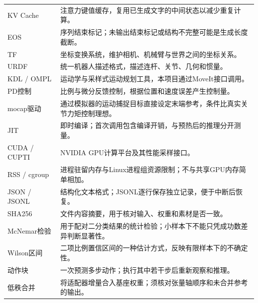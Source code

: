 \begin{longtable}{p{.18\linewidth}p{.72\linewidth}}
KV Cache & 注意力键值缓存，复用已生成文字的中间状态以减少重复计算。\\
EOS & 序列结束标记；未输出结束标记或结构不完整可能是生成长度截断。\\
TF & 坐标变换系统，维护相机、机械臂与世界之间的坐标关系。\\
URDF & 统一机器人描述格式，描述连杆、关节、几何和惯量。\\
KDL / OMPL & 运动学与采样式运动规划工具，本项目通过MoveIt接口调用。\\
PD控制 & 比例与微分反馈控制，根据位置和速度误差产生控制量。\\
mocap驱动 & 通过模拟器的运动捕捉目标直接设定末端参考，条件比真实关节力矩控制理想。\\
JIT & 即时编译；首次调用包含编译开销，与预热后的推理分开测量。\\
CUDA / CUPTI & NVIDIA GPU计算平台及其性能采样接口。\\
RSS / cgroup & 进程驻留内存与Linux进程组资源限制；不与共享GPU内存简单相加。\\
JSON / JSONL & 结构化文本格式；JSONL逐行保存独立记录，便于中断后恢复。\\
SHA256 & 文件内容摘要，用于核对输入、权重和素材是否一致。\\
McNemar检验 & 用于配对二分类结果的统计检验；小样本下不能只凭成功数差异判断显著性。\\
Wilson区间 & 二项比例置信区间的一种估计方式，反映有限样本下的不确定性。\\
动作块 & 一次预测多步动作；执行其中若干步后重新观察和推理。\\
低秩合并 & 将适配器增量合入基座权重；须核对张量轴顺序和未合并参考的输出。\\
\bottomrule\end{longtable}
